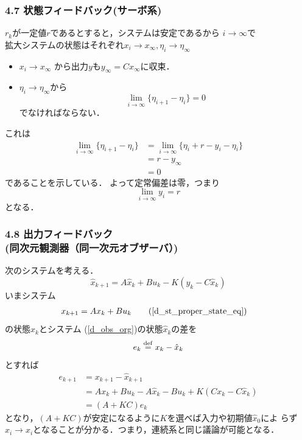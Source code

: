 \begin{frame}[t]
\frametitle{4.7 状態フィードバック(サーボ系)}
$r_k$が一定値$r$であるとすると，システムは安定であるから
$i\rightarrow \infty $で\\
拡大システムの状態はそれぞれ$x_i \to x_\infty , \eta_i \to \eta_\infty$\\
\begin{itemize}
	\item $x_i \to x_\infty$ から出力$y$も$y_{\infty} = C x_{\infty}$に収束．
	\item $\eta_i \to \eta_\infty$から
		\begin{equation}
		 \lim_{i \rightarrow \infty} \{\eta_{i+1}-\eta_{i}\} = 0
		\end{equation}
		でなければならない．
\end{itemize}
これは
		\begin{align}
		 \lim_{i \rightarrow \infty} \{ \eta_{i+1} - \eta_i \}
		  &= \lim_{i \rightarrow \infty}
		  \{ \eta_i + r - y_i - \eta_i \}\nonumber \\
		 &= r - y_{\infty}\nonumber \\
		 &= 0
\end{align}
であることを示している．
よって定常偏差は零，つまり
\begin{equation}
 \lim_{i \rightarrow \infty} y_i = r
\end{equation}
となる．
\end{frame}

\begin{frame}[t]
\frametitle{4.8 出力フィードバック\\
(同次元観測器（同一次元オブザーバ）)}
次のシステムを考える．
\begin{equation}
 \hat{x}_{k+1} = A \hat{x}_k + B u_k - K (y_k - C \hat{x}_k)
  \label{d_obs_org}
\end{equation}
いまシステム
\begin{align}
   x_{k+1} &= A x_k + B u_k \tag{\ref{d_st_proper_state_eq}}
\end{align}
の状態$x_k$とシステム
(\ref{d_obs_org})の状態$\hat{x}_k$の差を
\begin{equation}
 e_k \stackrel{\rm def}{=} x_k - \hat{x}_k
\end{equation}
とすれば
\begin{align}
 e_{k+1} &= x_{k+1} - \hat{x}_{k+1} \nonumber \\
         &= A x_k + B u_k 
	  - A \hat{x}_k - B u_k + K ( C x_k - C \hat{x}_k) \nonumber \\
         &= (A + KC) e_k
\end{align}
となり，$(A + KC)$が安定になるように$K$を選べば入力や初期値$\hat{x}_0$によ
らず$\hat{x}_i \rightarrow x_i$となることが分かる．つまり，連続系と同じ議論が可能となる．
\end{frame}

